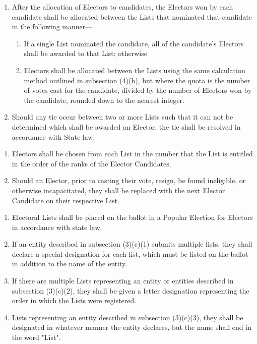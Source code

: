 \documentclass{article}
\begin{document}
    \begin{enumerate}
        \item After the allocation of Electors to candidates, the Electors won by each candidate shall be allocated between the Lists that nominated that candidate in the following manner---
        \begin{enumerate}
            \item If a single List nominated the candidate, all of the candidate's Electors shall be awarded to that List; otherwise
            \item Electors shall be allocated between the Lists using the same calculation method outlined in subsection (4)(b), but where the quota is the number of votes cast for the candidate, divided by the number of Electors won by the candidate, rounded down to the nearest integer.
        \end{enumerate}
        \item Should any tie occur between two or more Lists such that it can not be determined which
        shall be awarded an Elector, the tie shall be resolved in accordance with State law.
    \end{enumerate}
    \begin{enumerate}
        \item Electors shall be chosen from each List in the number that the List is entitled in the order of the ranks of the Elector Candidates.
        \item Should an Elector, prior to casting their vote, resign, be found ineligible, or otherwise incapacitated, they shall be replaced with the next Elector Candidate on their respective List.
    \end{enumerate}
    \begin{enumerate}
        \item Electoral Lists shall be placed on the ballot in a Popular Election for Electors in accordance with state law.
        \item If an entity described in subsection (3)(c)(1) submits multiple lists, they shall declare a special designation for each list, which must be listed on the ballot in addition to the name of the entity.
        \item If there are multiple Lists representing an entity or entities described in subsection (3)(c)(2), they shall be given a letter designation representing the order in which the Lists were registered.
        \item Lists representing an entity described in subsection (3)(c)(3), they shall be designated in whatever manner the entity declares, but the name shall end in the word "List". 
    \end{enumerate}
\end{document}
